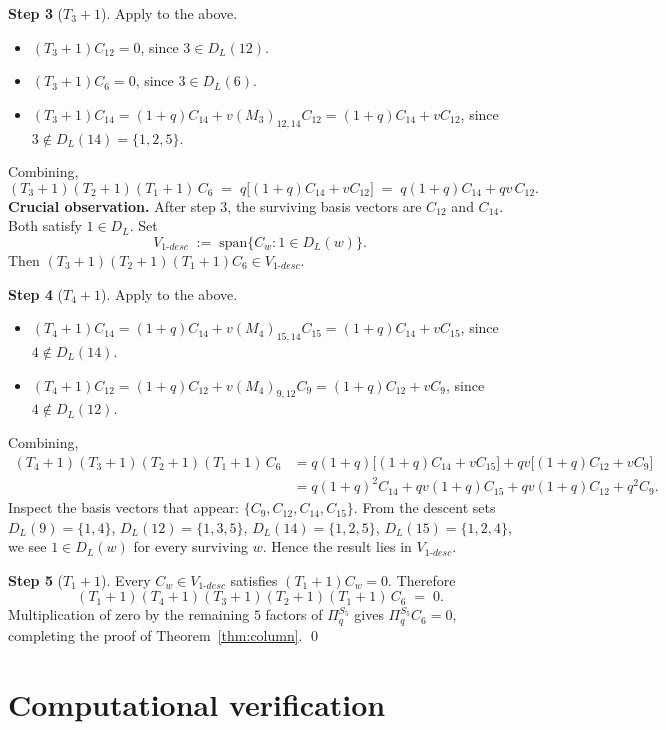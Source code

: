 \documentclass[11pt]{article}
\theoremstyle{definition}
\begin{document}
\noindent\textbf{Step 3} ($T_3+1$). Apply to the above.
\begin{itemize}[leftmargin=2em,topsep=0.2em,itemsep=0.1em]
\item $(T_3+1)C_{12} = 0$, since $3 \in D_L(12)$.
\item $(T_3+1)C_6 = 0$, since $3 \in D_L(6)$.
\item $(T_3+1)C_{14} = (1+q)C_{14} + v(M_3)_{12,14}C_{12} = (1+q)C_{14} + vC_{12}$, since $3 \notin D_L(14) = \{1,2,5\}$.
\end{itemize}
Combining,
\[
(T_3+1)(T_2+1)(T_1+1)\,C_6 \;=\; q\bigl[(1+q)C_{14} + vC_{12}\bigr] \;=\; q(1+q)C_{14} + qv\,C_{12}.
\]
\textbf{Crucial observation.} After step 3, the surviving basis vectors are $C_{12}$ and $C_{14}$. Both satisfy $1 \in D_L$. Set
\[
V_{1\text{-}desc} \;:=\; \mathrm{span}\bigl\{C_w : 1 \in D_L(w)\bigr\}.
\]
Then $(T_3+1)(T_2+1)(T_1+1)C_6 \in V_{1\text{-}desc}$.

\noindent\textbf{Step 4} ($T_4+1$). Apply to the above.
\begin{itemize}[leftmargin=2em,topsep=0.2em,itemsep=0.1em]
\item $(T_4+1)C_{14} = (1+q)C_{14} + v(M_4)_{15, 14}C_{15} = (1+q)C_{14} + vC_{15}$, since $4 \notin D_L(14)$.
\item $(T_4+1)C_{12} = (1+q)C_{12} + v(M_4)_{9, 12}C_9 = (1+q)C_{12} + vC_9$, since $4 \notin D_L(12)$.
\end{itemize}
Combining,
\begin{align*}
(T_4+1)(T_3+1)(T_2+1)(T_1+1)\,C_6 &= q(1+q)\bigl[(1+q)C_{14} + vC_{15}\bigr] + qv\bigl[(1+q)C_{12} + vC_9\bigr]\\
&= q(1+q)^2 C_{14} + qv(1+q)C_{15} + qv(1+q)C_{12} + q^2 C_9.
\end{align*}
Inspect the basis vectors that appear: $\{C_9, C_{12}, C_{14}, C_{15}\}$. From the descent sets $D_L(9) = \{1,4\}$, $D_L(12) = \{1,3,5\}$, $D_L(14) = \{1,2,5\}$, $D_L(15) = \{1,2,4\}$, we see $1 \in D_L(w)$ for every surviving $w$. Hence the result lies in $V_{1\text{-}desc}$.

\noindent\textbf{Step 5} ($T_1+1$). Every $C_w \in V_{1\text{-}desc}$ satisfies $(T_1+1)C_w = 0$. Therefore
\[
(T_1+1)(T_4+1)(T_3+1)(T_2+1)(T_1+1)\,C_6 \;=\; 0.
\]
Multiplication of zero by the remaining $5$ factors of $\Pi_q^{S_5}$ gives $\Pi_q^{S_5} C_6 = 0$, completing the proof of Theorem~\ref{thm:column}. \qed

\section{Computational verification}\label{sec:verify}
\end{document}
